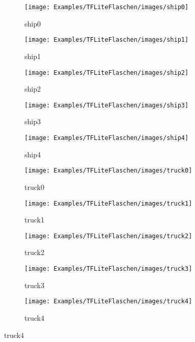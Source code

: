 \begin{figure} [H]
	    \begin{subfigure}{0.19\textwidth}
    \centering
	\texttt{[image: Examples/TFLiteFlaschen/images/ship0]}
	\caption{ship0}
	\end{subfigure}
	\begin{subfigure}{0.19\textwidth}
    \centering
	\texttt{[image: Examples/TFLiteFlaschen/images/ship1]}
	\caption{ship1}
	\end{subfigure}
	\begin{subfigure}{0.19\textwidth}
    \centering
	\texttt{[image: Examples/TFLiteFlaschen/images/ship2]}
	\caption{ship2}
	\end{subfigure}
	\begin{subfigure}{0.19\textwidth}
    \centering
	\texttt{[image: Examples/TFLiteFlaschen/images/ship3]}
	\caption{ship3}
	\end{subfigure}
	\begin{subfigure}{0.19\textwidth}
    \centering
	\texttt{[image: Examples/TFLiteFlaschen/images/ship4]}
	\caption{ship4}
	\end{subfigure}
	
	    \begin{subfigure}{0.19\textwidth}
    \centering
	\texttt{[image: Examples/TFLiteFlaschen/images/truck0]}
	\caption{truck0}
	\end{subfigure}
	\begin{subfigure}{0.19\textwidth}
    \centering
	\texttt{[image: Examples/TFLiteFlaschen/images/truck1]}
	\caption{truck1}
	\end{subfigure}
	\begin{subfigure}{0.19\textwidth}
    \centering
	\texttt{[image: Examples/TFLiteFlaschen/images/truck2]}
	\caption{truck2}
	\end{subfigure}
	\begin{subfigure}{0.19\textwidth}
    \centering
	\texttt{[image: Examples/TFLiteFlaschen/images/truck3]}
	\caption{truck3}
	\end{subfigure}
	\begin{subfigure}{0.19\textwidth}
    \centering
	\texttt{[image: Examples/TFLiteFlaschen/images/truck4]}
	\caption{truck4}
	\end{subfigure}
	

\end{figure}
